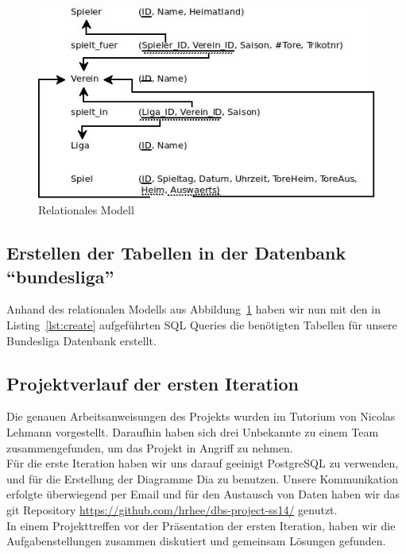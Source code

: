 \documentclass[
10pt,
a4paper
]{scrartcl}
\begin{document}
\begin{figure}[H]
	\centering
  \includegraphics[scale=0.6]{relat.jpg}
	\caption{Relationales Modell }
	\label{fig:relat}
\end{figure}

\subsection{Erstellen der Tabellen in der Datenbank “bundesliga”}
Anhand des relationalen Modells aus Abbildung~\ref{fig:relat} haben wir nun mit den in Listing~\ref{lst:create} aufgeführten SQL Queries die benötigten Tabellen für unsere Bundesliga Datenbank erstellt.
 


\subsection{Projektverlauf der ersten Iteration}

Die genauen Arbeitsanweisungen des Projekts wurden im Tutorium von Nicolas Lehmann vorgestellt. Daraufhin haben sich drei Unbekannte  zu einem Team zusammengefunden, um das Projekt in Angriff zu nehmen.\\
Für die erste Iteration haben wir uns darauf geeinigt PostgreSQL zu verwenden, und für die Erstellung der Diagramme Dia zu benutzen. Unsere Kommunikation erfolgte überwiegend per Email und für den Austausch von Daten haben wir das git  Repository \url{https://github.com/hrhee/dbs-project-ss14/} genutzt.\\
In einem Projekttreffen vor der Präsentation der ersten Iteration, haben wir die Aufgabenstellungen zusammen diskutiert und gemeinsam Lösungen gefunden.
\end{document}
